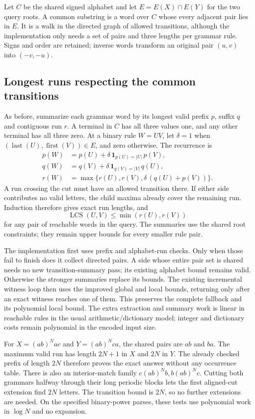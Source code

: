 Let $C$ be the shared signed alphabet and let $E=E(X)\cap E(Y)$ for the
two query roots. A common substring is a word over $C$ whose every adjacent
pair lies in $E$. It is a walk in the directed graph of allowed transitions,
although the implementation only needs a set of pairs and three lengths
per grammar rule. Signs and order are retained; inverse words transform
an original pair $(u,v)$ into $(-v,-u)$.

\subsection{Longest runs respecting the common transitions}

As before, summarize each grammar word by its longest valid prefix $p$,
suffix $q$ and contiguous run $r$. A terminal in $C$ has all three values
one, and any other terminal has all three zero. At a binary rule $W=UV$,
let $\delta=1$ when
$(\operatorname{last}(U),\operatorname{first}(V))\in E$, and zero otherwise.
The recurrence is
\[
\begin{aligned}
 p(W)&=p(U)+\delta\,\mathbf1_{p(U)=|U|}\,p(V),\\
 q(W)&=q(V)+\delta\,\mathbf1_{q(V)=|V|}\,q(U),\\
 r(W)&=\max\{r(U),r(V),\delta\,(q(U)+p(V))\}.
\end{aligned}
\]
A run crossing the cut must have an allowed transition there. If either
side contributes no valid letters, the child maxima already cover the
remaining run. Induction therefore gives exact run lengths, and
\[
 \operatorname{LCS}(U,V)\le\min(r(U),r(V))
\]
for any pair of reachable words in the query. The summaries use the shared
root constraints; they remain upper bounds for every smaller rule pair.

The implementation first uses prefix and alphabet-run checks. Only when
those fail to finish does it collect directed pairs. A side whose entire
pair set is shared needs no new transition-summary pass; its existing
alphabet bound remains valid. Otherwise the stronger summaries replace
its bounds. The existing incremental witness loop then uses the improved
global and local bounds, returning only after an exact witness reaches
one of them. This preserves the complete fallback and its polynomial
local bound. The extra extraction and summary work is linear in reachable
rules in the usual arithmetic/dictionary model; integer and dictionary
costs remain polynomial in the encoded input size.

For $X=(ab)^Nac$ and $Y=(ab)^Nca$, the shared pairs are $ab$ and $ba$.
The maximum valid run has length $2N+1$ in $X$ and $2N$ in $Y$.
The already checked prefix of length $2N$ therefore proves the exact
answer without any occurrence table. There is also an interior-match
family $c(ab)^Nb,b(ab)^Nc$. Cutting both grammars halfway through their
long periodic blocks lets the first aligned-cut extension find $2N$
letters. The transition bound is $2N$, so no further extensions are needed.
On the specified binary-power parses, these tests use polynomial work in
$\log N$ and no expansion.

